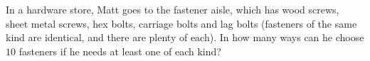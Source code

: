 In a hardware store, Matt goes to the fastener aisle, which has wood screws, sheet metal screws, hex bolts, carriage bolts and lag bolts (fasteners of the same kind are identical, and there are plenty of each). In how many ways can he choose $10$ fasteners if he needs at least one of each kind?
